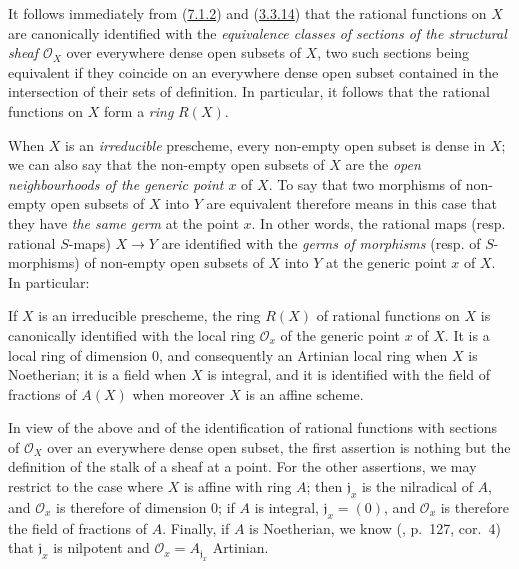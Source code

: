\begin{env}[7.1.3]
\label{I.7.1.3}
It follows immediately from (\hyperref[I.7.1.2]{7.1.2}) and
(\hyperref[I.3.3.14]{3.3.14}) that the rational functions on $X$ are
canonically identified with the
\emph{equivalence classes of sections of the structural sheaf
$\mathscr{O}_X$} over everywhere dense open subsets of $X$, two such sections
being equivalent if they coincide on an everywhere dense open subset contained
in the intersection of their sets of definition. In particular, it follows
that the rational functions on $X$ form a
\emph{ring} $R(X)$.
\end{env}

\begin{env}[7.1.4]
\label{I.7.1.4}
When $X$ is an \emph{irreducible} prescheme, every non-empty open subset is
dense in $X$; we can also say that the non-empty open subsets of $X$ are the
\emph{open neighbourhoods of the generic point $x$} of $X$. To say that two
morphisms of non-empty open subsets of $X$ into $Y$ are equivalent therefore
means in this case that they have \emph{the same germ} at the point $x$. In
other words, the rational maps (resp. rational $S$-maps)
$X\to Y$ are identified with the \emph{germs of morphisms} (resp. of
$S$-morphisms) of non-empty open subsets of $X$ into $Y$ at the generic point
$x$ of $X$. In particular:
\end{env}

\begin{proposition}[7.1.5]
\label{I.7.1.5}
If $X$ is an irreducible prescheme, the ring $R(X)$ of rational functions
on $X$ is canonically identified with the local ring $\mathscr{O}_x$ of the
generic point $x$ of $X$. It is a local ring of dimension 0, and consequently
an Artinian local ring when $X$ is Noetherian; it is a field when $X$ is
integral, and it is identified with the field of fractions of $A(X)$ when
moreover $X$ is an affine scheme.
\end{proposition}

In view of the above and of the identification of rational functions with
sections of $\mathscr{O}_X$ over an everywhere dense open subset, the first
assertion is nothing but the definition of the stalk of a sheaf at a point.
For the other assertions, we may restrict to the case where $X$ is affine with
ring $A$; then $\mathfrak{j}_x$ is the nilradical of $A$, and $\mathscr{O}_x$
is therefore of dimension 0; if $A$ is integral, $\mathfrak{j}_x=(0)$, and
$\mathscr{O}_x$ is therefore the field of fractions of $A$. Finally, if $A$ is
Noetherian, we know (\cite{I-11}, p.~127, cor.~4) that $\mathfrak{j}_x$ is
nilpotent and $\mathscr{O}_x=A_{\mathfrak{j}_x}$ Artinian.

